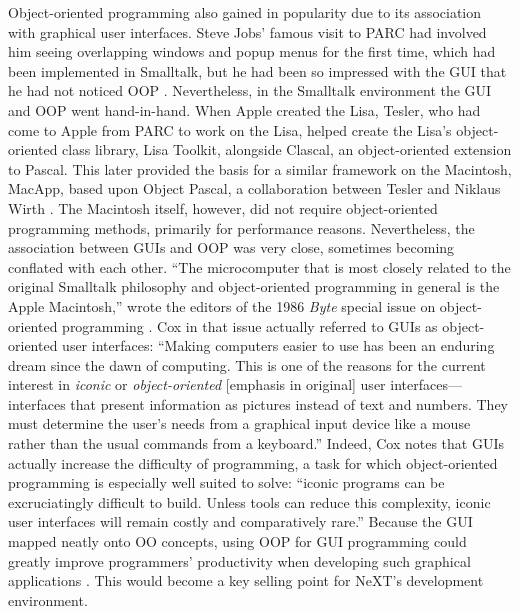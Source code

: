 \documentclass[acmsmall]{acmart}\settopmatter{}
\begin{document}
Object-oriented programming also gained in popularity due to its association with graphical user interfaces. Steve Jobs' famous visit to PARC had involved him seeing overlapping windows and popup menus for the first time, which had been implemented in Smalltalk, but he had been so impressed with the GUI that he had not noticed OOP \citetext{\citealp{cringely_steve_2012}; \citealp[330]{hiltzik_dealers_1999}}. Nevertheless, in the Smalltalk environment the GUI and OOP went hand-in-hand. When Apple created the Lisa, Tesler, who had come to Apple from PARC to work on the Lisa, helped create the Lisa's object-oriented class library, Lisa Toolkit, alongside Clascal, an object-oriented extension to Pascal. This later provided the basis for a similar framework on the Macintosh, MacApp, based upon Object Pascal, a collaboration between Tesler and Niklaus Wirth \citep{schmucker_object-oriented_1986,schmucker_macapp:_1986,tesler_oral_2016}. The Macintosh itself, however, did not require object-oriented programming methods, primarily for performance reasons. Nevertheless, the association between GUIs and OOP was very close, sometimes becoming conflated with each other. ``The microcomputer that is most closely related to the original Smalltalk philosophy and object-oriented programming in general is the Apple Macintosh,'' wrote the editors of the 1986 \emph{Byte} special issue on object-oriented programming \citep[137]{white_object-oriented_1986}. Cox in that issue actually referred to GUIs as object-oriented user interfaces: ``Making computers easier to use has been an enduring dream since the dawn of computing. This is one of the reasons for the current interest in \emph{iconic} or \emph{object-oriented} [emphasis in original] user interfaces---interfaces that present information as pictures instead of text and numbers.\textellipsis{} They must determine the user's needs from a graphical input device like a mouse rather than the usual commands from a keyboard.'' Indeed, Cox notes that GUIs actually increase the difficulty of programming, a task for which object-oriented programming is especially well suited to solve: ``\textellipsis{}iconic programs can be excruciatingly difficult to build.\textellipsis{} Unless tools can reduce this complexity, iconic user interfaces will remain costly and comparatively rare.'' \citep[161]{cox_objects_1986} Because the GUI mapped neatly onto OO concepts, using OOP for GUI programming could greatly improve programmers' productivity when developing such graphical applications \citep{schmucker_object-oriented_1986,schmucker_macapp:_1986,tesler_programming_1986}. This would become a key selling point for NeXT's development environment.
\end{document}
